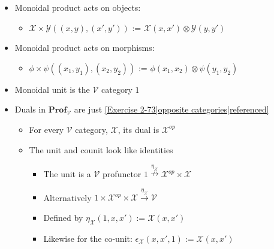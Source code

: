 \begin{itemize}
    \item Monoidal product acts on objects:
          \begin{itemize}
            \item $\mathcal{X} \times \mathcal{Y}((x,y),(x',y'))$ := $\mathcal{X}(x,x') \otimes \mathcal{Y}(y,y')$
          \end{itemize}
    \item Monoidal product acts on morphisms:
          \begin{itemize}
            \item $\phi \times \psi((x_1,y_1),(x_2,y_2))$ := $\phi(x_1,x_2)\otimes\psi(y_1,y_2)$
          \end{itemize}
    \item Monoidal unit is the $\mathcal{V}$ category $1$
    \item Duals in $\mathbf{Prof}_\mathcal{V}$ are just \ref{Exercise 2-73|opposite categories|referenced}
          \begin{itemize}
            \item For every $\mathcal{V}$ category, $\mathcal{X}$, its dual is $\mathcal{X}^{op}$
            \item The unit and counit look like identities
                  \begin{itemize}
                    \item The unit is a $\mathcal{V}$ profunctor $1 \overset{\eta_\mathcal{X}}\nrightarrow \mathcal{X}^{op} \times \mathcal{X}$
                    \item Alternatively $1 \times \mathcal{X}^{op} \times \mathcal{X}\xrightarrow{\eta_\mathcal{X}}\mathcal{V}$
                    \item Defined by $\eta_\mathcal{X}(1,x,x'):=\mathcal{X}(x,x')$
                    \item Likewise for the co-unit: $\epsilon_\mathcal{X}(x,x',1):=\mathcal{X}(x,x')$
                  \end{itemize}
          \end{itemize}
  \end{itemize}
